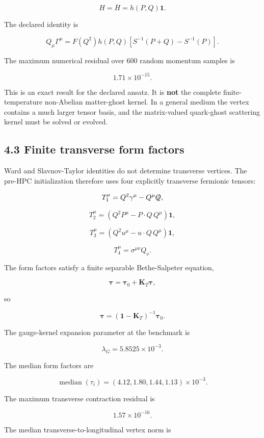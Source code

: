 \documentclass[
  10pt,
]{article}
\begin{document}
\[
H=\overline H=h(P,Q)\mathbf1.
\]

The declared identity is

\[
Q_\mu\Gamma^\mu
=
F(Q^2)h(P,Q)
\left[
S^{-1}(P+Q)-S^{-1}(P)
\right].
\]

The maximum numerical residual over 600 random momentum samples is

\[
\boxed{1.71\times10^{-15}.}
\]

This is an exact result for the declared ansatz. It is \textbf{not} the
complete finite-temperature non-Abelian matter-ghost kernel. In a
general medium the vertex contains a much larger tensor basis, and the
matrix-valued quark-ghost scattering kernel must be solved or evolved.

\subsection{4.3 Finite transverse form
factors}\label{finite-transverse-form-factors}

Ward and Slavnov-Taylor identities do not determine transverse vertices.
The pre-HPC initialization therefore uses four explicitly transverse
fermionic tensors:

\[
T_1^\mu=Q^2\gamma^\mu-Q^\mu\slashed Q,
\]

\[
T_2^\mu=\left(Q^2P^\mu-P\cdot Q\,Q^\mu\right)\mathbf1,
\]

\[
T_3^\mu=\left(Q^2u^\mu-u\cdot Q\,Q^\mu\right)\mathbf1,
\]

\[
T_4^\mu=\sigma^{\mu\nu}Q_\nu.
\]

The form factors satisfy a finite separable Bethe-Salpeter equation,

\[
\boldsymbol\tau
=
\boldsymbol\tau_0
+
\mathbf K_T\boldsymbol\tau,
\]

so

\[
\boldsymbol\tau
=
(\mathbf1-\mathbf K_T)^{-1}\boldsymbol\tau_0.
\]

The gauge-kernel expansion parameter at the benchmark is

\[
\lambda_G=5.8525\times10^{-3}.
\]

The median form factors are

\[
\operatorname{median}(\tau_i)
=
(4.12,1.80,1.44,1.13)\times10^{-3}.
\]

The maximum transverse contraction residual is

\[
\boxed{1.57\times10^{-16}.}
\]

The median transverse-to-longitudinal vertex norm is
\end{document}
